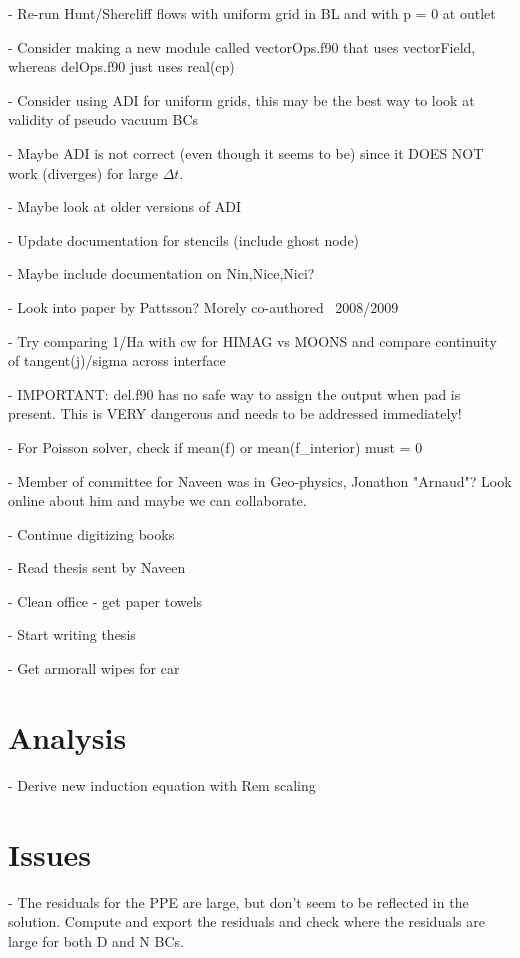 \documentclass[11pt]{article}
\begin{document}
- Re-run Hunt/Shercliff flows with uniform grid in BL and with p = 0 at outlet

- Consider making a new module called vectorOps.f90 that uses vectorField, whereas delOps.f90 just uses real(cp)

- Consider using ADI for uniform grids, this may be the best way to look at validity of pseudo vacuum BCs

- Maybe ADI is not correct (even though it seems to be) since it DOES NOT work (diverges) for large $\Delta t$.

- Maybe look at older versions of ADI

- Update documentation for stencils (include ghost node)

- Maybe include documentation on Nin,Nice,Nici?

- Look into paper by Pattsson? Morely co-authored ~2008/2009

- Try comparing 1/Ha with cw for HIMAG vs MOONS and compare continuity of tangent(j)/sigma across interface

- IMPORTANT: del.f90 has no safe way to assign the output when pad is present. This is VERY dangerous and needs to be addressed immediately!

- For Poisson solver, check if mean(f) or mean(f\_interior) must = 0

- Member of committee for Naveen was in Geo-physics, Jonathon "Arnaud"? Look online about him and maybe we can collaborate.

- Continue digitizing books

- Read thesis sent by Naveen

- Clean office - get paper towels

- Start writing thesis

- Get armorall wipes for car

\section{Analysis}

- Derive new induction equation with Rem scaling

\section{Issues}

- The residuals for the PPE are large, but don't seem to be reflected in the solution. Compute and export the residuals and check where the residuals are large for both D and N BCs.
\end{document}
